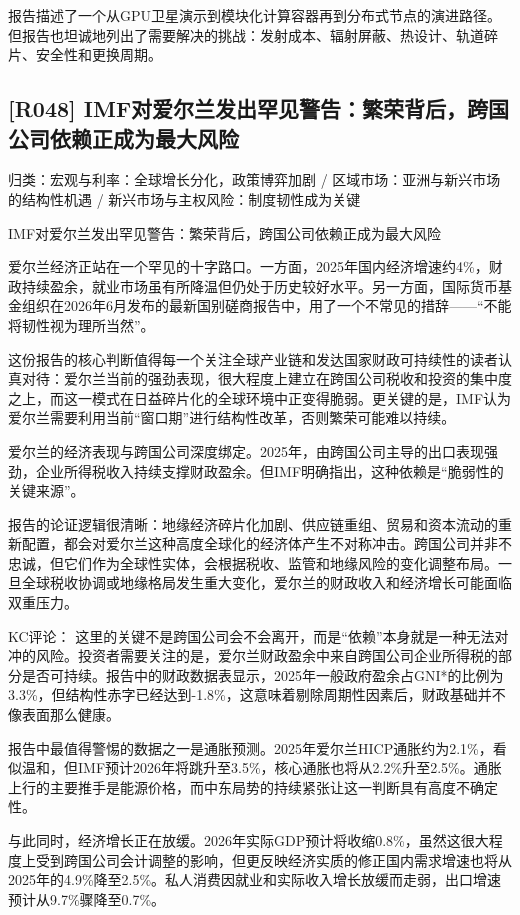 \documentclass[11pt]{ctexart}
\begin{document}
报告描述了一个从GPU卫星演示到模块化计算容器再到分布式节点的演进路径。但报告也坦诚地列出了需要解决的挑战：发射成本、辐射屏蔽、热设计、轨道碎片、安全性和更换周期。

\subsection{[R048] IMF对爱尔兰发出罕见警告：繁荣背后，跨国公司依赖正成为最大风险}
{\small\color{refgray}归类：宏观与利率：全球增长分化，政策博弈加剧 / 区域市场：亚洲与新兴市场的结构性机遇 / 新兴市场与主权风险：制度韧性成为关键}

IMF对爱尔兰发出罕见警告：繁荣背后，跨国公司依赖正成为最大风险

爱尔兰经济正站在一个罕见的十字路口。一方面，2025年国内经济增速约4\%，财政持续盈余，就业市场虽有所降温但仍处于历史较好水平。另一方面，国际货币基金组织在2026年6月发布的最新国别磋商报告中，用了一个不常见的措辞——“不能将韧性视为理所当然”。

这份报告的核心判断值得每一个关注全球产业链和发达国家财政可持续性的读者认真对待：爱尔兰当前的强劲表现，很大程度上建立在跨国公司税收和投资的集中度之上，而这一模式在日益碎片化的全球环境中正变得脆弱。更关键的是，IMF认为爱尔兰需要利用当前“窗口期”进行结构性改革，否则繁荣可能难以持续。

爱尔兰的经济表现与跨国公司深度绑定。2025年，由跨国公司主导的出口表现强劲，企业所得税收入持续支撑财政盈余。但IMF明确指出，这种依赖是“脆弱性的关键来源”。

报告的论证逻辑很清晰：地缘经济碎片化加剧、供应链重组、贸易和资本流动的重新配置，都会对爱尔兰这种高度全球化的经济体产生不对称冲击。跨国公司并非不忠诚，但它们作为全球性实体，会根据税收、监管和地缘风险的变化调整布局。一旦全球税收协调或地缘格局发生重大变化，爱尔兰的财政收入和经济增长可能面临双重压力。

KC评论： 这里的关键不是跨国公司会不会离开，而是“依赖”本身就是一种无法对冲的风险。投资者需要关注的是，爱尔兰财政盈余中来自跨国公司企业所得税的部分是否可持续。报告中的财政数据表显示，2025年一般政府盈余占GNI*的比例为3.3\%，但结构性赤字已经达到-1.8\%，这意味着剔除周期性因素后，财政基础并不像表面那么健康。

报告中最值得警惕的数据之一是通胀预测。2025年爱尔兰HICP通胀约为2.1\%，看似温和，但IMF预计2026年将跳升至3.5\%，核心通胀也将从2.2\%升至2.5\%。通胀上行的主要推手是能源价格，而中东局势的持续紧张让这一判断具有高度不确定性。

与此同时，经济增长正在放缓。2026年实际GDP预计将收缩0.8\%，虽然这很大程度上受到跨国公司会计调整的影响，但更反映经济实质的修正国内需求增速也将从2025年的4.9\%降至2.5\%。私人消费因就业和实际收入增长放缓而走弱，出口增速预计从9.7\%骤降至0.7\%。
\end{document}
